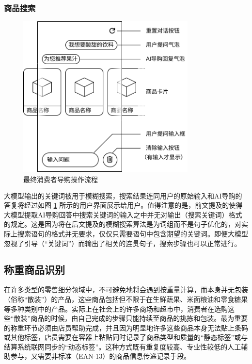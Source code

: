 \subsubsection{商品搜索}

\begin{figure}[htbp]
	\centering
	\includegraphics[width=0.8\textwidth, height=0.3\textheight, keepaspectratio]{./imgs/se-assist.png}
	\caption{最终消费者导购操作流程}
	\label{fig:se-assist}
\end{figure}

大模型输出的关键词被用于模糊搜索，搜索结果连同用户的原始输入和AI导购的答复将经过如图 \ref{fig:se-assist} 所示的用户界面展示给用户。值得注意的是，前文提及的使得大模型提取AI导购回答中搜索关键词的输入之中并无对输出（搜索关键词）格式的规定。这是因为将在后文提及的模糊搜索算法是为词组而不是句子优化的，对实际上搜索语句的格式并无要求，仅仅只需要语句中包含期望的关键词。即便大模型忽视了引导（“关键词”）而输出了相关的连贯句子，搜索步骤也可以正常进行。

\subsection{称重商品识别}

在许多类型的零售细分领域中，不可避免地将会遇到按重量计算，而本身并无包装（俗称“散装”）的产品，这些商品包括但不限于在生鲜蔬果、米面粮油和零食糖果等多种类别中的产品。实际上在社会上的许多商场和超市中，消费者在选购这些“散装”商品的时候，由自己完成的步骤只能持续至商品的挑拣和包装。最为重要的称重环节必须由店员帮助完成，并且因为明显地许多这些商品本身无法贴上条码或其他标签，店员需要在容器上粘贴同时记录了商品类型和质量的“静态标签”或与结算系统联网同步的“动态标签”。这种方式既有重复度较高、专业性较低的人工辅助参与，又需要非标准（EAN-13）的商品信息传递记录手段。

